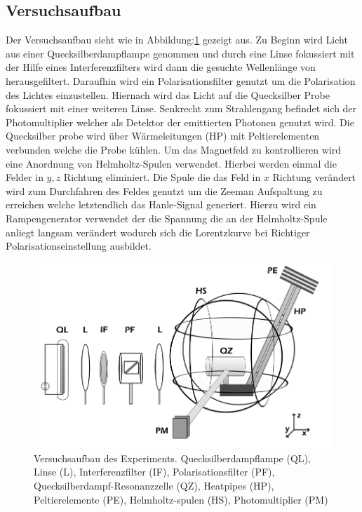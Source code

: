 \subsection{Versuchsaufbau}
Der Versuchsaufbau sieht wie in Abbildung:\ref{VAufbau} gezeigt aus. Zu Beginn wird Licht aus einer Quecksilberdampflampe genommen und durch eine Linse fokussiert mit der Hilfe eines Interferenzfilters wird dann die gesuchte Wellenlänge von herausgefiltert. Daraufhin wird ein Polarisationsfilter genutzt um die Polarisation des Lichtes einzustellen. Hiernach wird das Licht auf die Quecksilber Probe fokussiert mit einer weiteren Linse. Senkrecht zum Strahlengang befindet sich der Photomultiplier welcher als Detektor der emittierten Photonen genutzt wird. Die Quecksilber probe wird über Wärmeleitungen (HP) mit Peltierelementen verbunden welche die Probe kühlen. Um das Magnetfeld zu kontrollieren wird eine Anordnung von Helmholtz-Spulen verwendet. Hierbei werden einmal die Felder in $y,z$ Richtung eliminiert. Die Spule die das Feld in $x$ Richtung verändert wird zum Durchfahren des Feldes genutzt um die Zeeman Aufspaltung zu erreichen welche letztendlich das Hanle-Signal generiert. Hierzu wird ein Rampengenerator verwendet der die Spannung die an der Helmholtz-Spule anliegt langsam verändert wodurch sich die Lorentzkurve bei Richtiger Polarisationseinstellung ausbildet.
\begin{figure}[ht]
	\includegraphics[scale=0.9]{Bild/VAufbau}
	\centering
	\caption[Versuchsaufbau]{Versuchsaufbau des Experiments. Quecksilberdampflampe (QL), Linse (L), Interferenzfilter (IF), Polarisationsfilter (PF), Quecksilberdampf-Resonanzzelle (QZ), Heatpipes (HP), Peltierelemente (PE), Helmholtz-spulen (HS), Photomultiplier (PM)}
	\label{VAufbau}
\end{figure} 
\FloatBarrier
